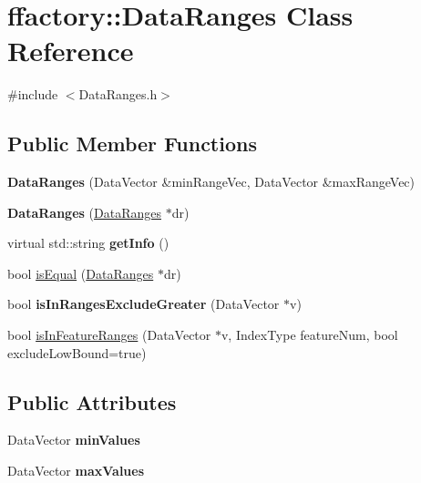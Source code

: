 \hypertarget{classffactory_1_1_data_ranges}{\section{ffactory\-:\-:Data\-Ranges Class Reference}
\label{classffactory_1_1_data_ranges}
}


{\ttfamily \#include $<$Data\-Ranges.\-h$>$}

\subsection*{Public Member Functions}
\begin{DoxyCompactItemize}
\item 
\hypertarget{classffactory_1_1_data_ranges_a030ee8838df1e3a4739bf17270ad11e3}{{\bfseries Data\-Ranges} (Data\-Vector \&min\-Range\-Vec, Data\-Vector \&max\-Range\-Vec)}\label{classffactory_1_1_data_ranges_a030ee8838df1e3a4739bf17270ad11e3}

\item 
\hypertarget{classffactory_1_1_data_ranges_a7184914acdd43a9d2ec269ba3d7b47e9}{{\bfseries Data\-Ranges} (\hyperlink{classffactory_1_1_data_ranges}{Data\-Ranges} $\ast$dr)}\label{classffactory_1_1_data_ranges_a7184914acdd43a9d2ec269ba3d7b47e9}

\item 
\hypertarget{classffactory_1_1_data_ranges_a6d488ebe76ca0a14b7ff06f1e5de416b}{virtual std\-::string {\bfseries get\-Info} ()}\label{classffactory_1_1_data_ranges_a6d488ebe76ca0a14b7ff06f1e5de416b}

\item 
bool \hyperlink{classffactory_1_1_data_ranges_ac71d2b6b9621948075373cbe90b85422}{is\-Equal} (\hyperlink{classffactory_1_1_data_ranges}{Data\-Ranges} $\ast$dr)
\item 
\hypertarget{classffactory_1_1_data_ranges_a667df88fa397cb1b87ed64c0159fb80e}{bool {\bfseries is\-In\-Ranges\-Exclude\-Greater} (Data\-Vector $\ast$v)}\label{classffactory_1_1_data_ranges_a667df88fa397cb1b87ed64c0159fb80e}

\item 
bool \hyperlink{classffactory_1_1_data_ranges_a7d7c2afc6fc81fa5e32f6b509e6afcfa}{is\-In\-Feature\-Ranges} (Data\-Vector $\ast$v, Index\-Type feature\-Num, bool exclude\-Low\-Bound=true)
\end{DoxyCompactItemize}
\subsection*{Public Attributes}
\begin{DoxyCompactItemize}
\item 
\hypertarget{classffactory_1_1_data_ranges_a6b44ba22ecd2601c42f48faf0657a681}{Data\-Vector {\bfseries min\-Values}}\label{classffactory_1_1_data_ranges_a6b44ba22ecd2601c42f48faf0657a681}

\item 
\hypertarget{classffactory_1_1_data_ranges_ae260ecd84bd0d4ec9b08615f3e3fb067}{Data\-Vector {\bfseries max\-Values}}\label{classffactory_1_1_data_ranges_ae260ecd84bd0d4ec9b08615f3e3fb067}

\end{DoxyCompactItemize}
